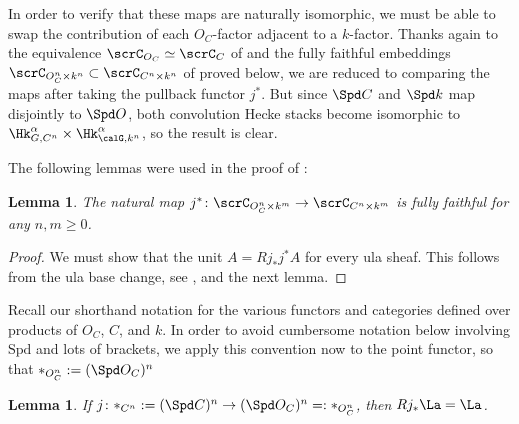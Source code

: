 \documentclass[10pt, reqno]{amsart}
\theoremstyle{plain}
\newtheorem{lemma}[theorem]{Lemma}
\theoremstyle{definition}
\numberwithin{equation}{section}
\begin{document}
	In order to verify that these maps are naturally isomorphic, we must be able to swap the contribution of each $O_C$-factor adjacent to a $k$-factor. %
	Thanks again to the equivalence $\scrC_{O_C} \simeq \scrC_C$ of \cite[Proposition 6.12]{AGLR22} and the fully faithful embeddings $\scrC_{O_C^n\times k^n} \subset \scrC_{C^n \times k^n}$ of  proved below, we are reduced to comparing the maps after taking the pullback functor $j^*$. But since $\Spd C$ and $\Spd k$ map disjointly to $\Spd O$, both convolution Hecke stacks become isomorphic to $\Hk_{G,C^n}^{\alpha}\times \Hk_{\calG,k^n}^{\alpha}$, so the result is clear. 
	
	The following lemmas were used in the proof of :
	
	\begin{lemma}\label{lem_fully_faithful_generic_pullback}
		The natural map $j^*\colon \scrC_{O_C^n\times k^m} \to \scrC_{C^n\times k^m}$ is fully faithful for any $n,m\geq 0$.
	\end{lemma}
	
	\begin{proof}
		We must show that the unit $A= Rj_*j^*A$ for every ula sheaf. This follows from the ula base change, see \cite[Corollary IV.2.29]{FS21}, and the next lemma.
	\end{proof}
	
	Recall our shorthand notation for the various functors and categories defined over products of $O_C$, $C$, and $k$. In order to avoid cumbersome notation below involving $\mathrm{Spd}$ and lots of brackets, we apply this convention now to the point functor, so that $*_{O_C^n}:=(\Spd O_C)^n$
	
	\begin{lemma}\label{lemma_nearby_cycles_prod_points_new}
		If $j\colon *_{C^n}:=(\Spd C)^n \to (\Spd O_C)^n=: *_{O_C^n}$, then $Rj_*\La=\La$.
	\end{lemma}
	
\end{document}
